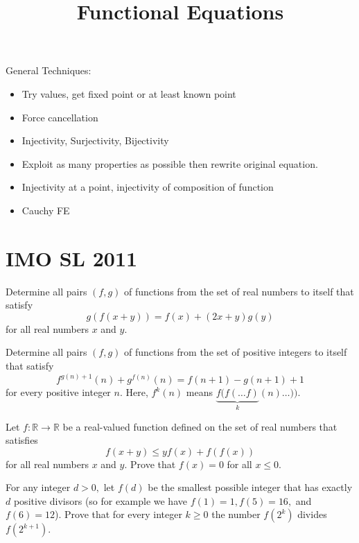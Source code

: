\documentclass[11pt]{scrartcl}
\begin{document}
\title{Functional Equations}
\maketitle

General Techniques:
\begin{itemize}
    \item Try values, get fixed point or at least known point
    \item Force cancellation
    \item Injectivity, Surjectivity, Bijectivity
    \item Exploit as many properties as possible then rewrite original equation.
    \item Injectivity at a point, injectivity of composition of function
    \item Cauchy FE
\end{itemize}

\section{IMO SL 2011}
\begin{Problem}
Determine all pairs $(f,g)$ of functions from the set of real numbers to itself that satisfy\[g(f(x+y)) = f(x) + (2x + y)g(y)\]for all real numbers $x$ and $y$.
\end{Problem}


\begin{Problem}
Determine all pairs $(f,g)$ of functions from the set of positive integers to itself that satisfy\[f^{g(n)+1}(n) + g^{f(n)}(n) = f(n+1) - g(n+1) + 1\]for every positive integer $n$. Here, $f^k(n)$ means $\underbrace{f(f(\ldots f)}_{k}(n) \ldots ))$.
\end{Problem}


\begin{Problem}
Let $f : \mathbb R \to \mathbb R$ be a real-valued function defined on the set of real numbers that satisfies
\[f(x + y) \leq yf(x) + f(f(x))\]
for all real numbers $x$ and $y$. Prove that $f(x) = 0$ for all $x \leq 0$.
\end{Problem}


\begin{Problem}
For any integer $d > 0,$ let $f(d)$ be the smallest possible integer that has exactly $d$ positive divisors (so for example we have $f(1)=1, f(5)=16,$ and $f(6)=12$). Prove that for every integer $k \geq 0$ the number $f\left(2^k\right)$ divides $f\left(2^{k+1}\right).$
\end{Problem}
\end{document}
